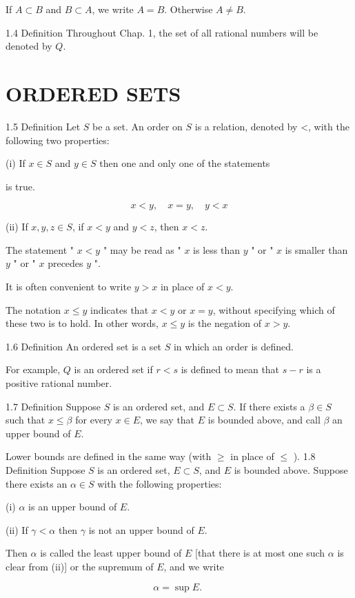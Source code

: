 \documentclass[10pt]{article}
\begin{document}
If $A \subset B$ and $B \subset A$, we write $A=B$. Otherwise $A \neq B$.

1.4 Definition Throughout Chap. 1, the set of all rational numbers will be denoted by $Q$.

\section{ORDERED SETS}
1.5 Definition Let $S$ be a set. An order on $S$ is a relation, denoted by <, with the following two properties:

(i) If $x \in S$ and $y \in S$ then one and only one of the statements

is true.

$$
x<y, \quad x=y, \quad y<x
$$

(ii) If $x, y, z \in S$, if $x<y$ and $y<z$, then $x<z$.

The statement " $x<y$ " may be read as " $x$ is less than $y$ " or " $x$ is smaller than $y$ " or " $x$ precedes $y$ ".

It is often convenient to write $y>x$ in place of $x<y$.

The notation $x \leq y$ indicates that $x<y$ or $x=y$, without specifying which of these two is to hold. In other words, $x \leq y$ is the negation of $x>y$.

1.6 Definition An ordered set is a set $S$ in which an order is defined.

For example, $Q$ is an ordered set if $r<s$ is defined to mean that $s-r$ is a positive rational number.

1.7 Definition Suppose $S$ is an ordered set, and $E \subset S$. If there exists a $\beta \in S$ such that $x \leq \beta$ for every $x \in E$, we say that $E$ is bounded above, and call $\beta$ an upper bound of $E$.

Lower bounds are defined in the same way (with $\geq$ in place of $\leq$ ). 1.8 Definition Suppose $S$ is an ordered set, $E \subset S$, and $E$ is bounded above. Suppose there exists an $\alpha \in S$ with the following properties:

(i) $\alpha$ is an upper bound of $E$.

(ii) If $\gamma<\alpha$ then $\gamma$ is not an upper bound of $E$.

Then $\alpha$ is called the least upper bound of $E$ [that there is at most one such $\alpha$ is clear from (ii)] or the supremum of $E$, and we write

$$
\alpha=\sup E \text {. }
$$
\end{document}
